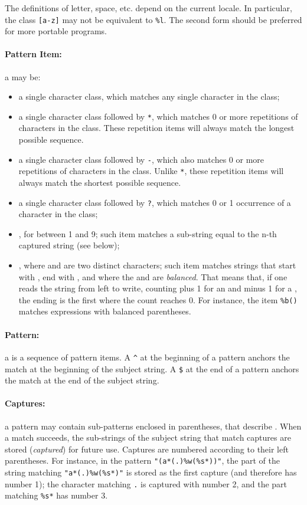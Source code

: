 The definitions of letter, space, etc. depend on the current locale.
In particular, the class \verb|[a-z]| may not be equivalent to \verb|%l|.
The second form should be preferred for more portable programs.

\paragraph{Pattern Item:}
a  may be:
\begin{itemize}
\item
a single character class,
which matches any single character in the class;
\item
a single character class followed by \verb|*|,
which matches 0 or more repetitions of characters in the class.
These repetition items will always match the longest possible sequence.
\item
a single character class followed by \verb|-|,
which also matches 0 or more repetitions of characters in the class.
Unlike \verb|*|,
these repetition items will always match the shortest possible sequence.
\item
a single character class followed by \verb|?|,
which matches 0 or 1 occurrence of a character in the class;
\item
{}, for  between 1 and 9;
such item matches a sub-string equal to the n-th captured string
(see below);
\item
{}, where  and  are two distinct characters;
such item matches strings that start with , end with ,
and where the  and  are \emph{balanced}.
That means that, if one reads the string from left to write,
counting plus 1 for an  and minus 1 for a ,
the ending  is the first where the count reaches 0.
For instance, the item \verb|%b()| matches expressions with
balanced parentheses.
\end{itemize}

\paragraph{Pattern:}
a  is a sequence of pattern items.
A \verb|^| at the beginning of a pattern anchors the match at the
beginning of the subject string.
A \verb|$| at the end of a pattern anchors the match at the
end of the subject string.

\paragraph{Captures:}
a pattern may contain sub-patterns enclosed in parentheses,
that describe .
When a match succeeds, the sub-strings of the subject string
that match captures are stored (\emph{captured}) for future use.
Captures are numbered according to their left parentheses.
For instance, in the pattern \verb|"(a*(.)%w(%s*))"|,
the part of the string matching \verb|"a*(.)%w(%s*)"| is
stored as the first capture (and therefore has number 1);
the character matching \verb|.| is captured with number 2,
and the part matching \verb|%s*| has number 3.


